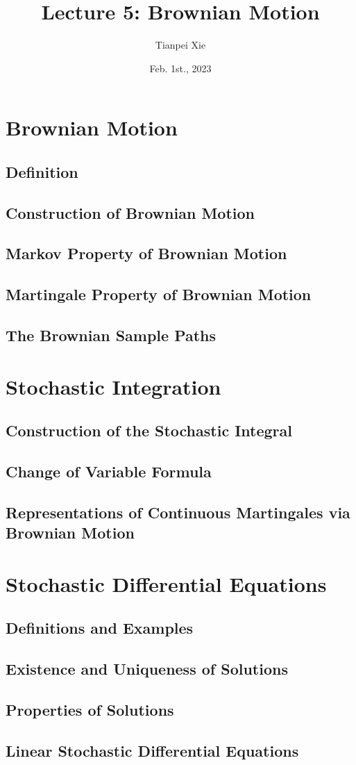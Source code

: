 \documentclass[11pt]{article}
\begin{document}
\title{Lecture 5: Brownian Motion}
\author{ Tianpei Xie}
\date{Feb. 1st., 2023}
\maketitle
\tableofcontents
\newpage
\section{Brownian Motion}
\subsection{Definition}
\subsection{Construction of Brownian Motion}
\subsection{Markov Property of Brownian Motion}
\subsection{Martingale Property of Brownian Motion}
\subsection{The Brownian Sample Paths}

\section{Stochastic Integration}
\subsection{Construction of the Stochastic Integral}
\subsection{Change of Variable Formula}
\subsection{Representations of Continuous Martingales via Brownian Motion}

\section{Stochastic Differential Equations}
\subsection{Definitions and Examples}
\subsection{Existence and Uniqueness of Solutions}
\subsection{Properties of Solutions}
\subsection{Linear Stochastic Differential Equations}
\newpage


\end{document}
